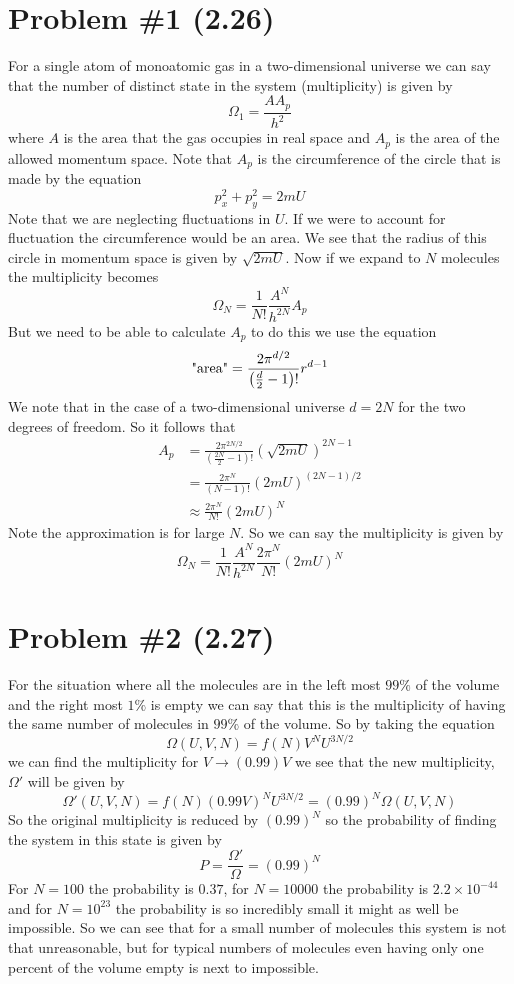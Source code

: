\documentclass[11pt]{article}
\numberwithin{equation}{section}
\begin{document}


\section{Problem \#1 (2.26)}
For a single atom of monoatomic gas in a two-dimensional universe we can say that the number of distinct state in the system (multiplicity) is given by
$$\Omega_1 = \frac{AA_p}{h^2}$$
where $A$ is the area that the gas occupies in real space and $A_p$ is the area of the allowed momentum space. Note that $A_p$ is the circumference of the circle that is made by the equation
$$p_x^2+p_y^2 = 2mU$$
Note that we are neglecting fluctuations in $U$. If we were to account for fluctuation the circumference would be an area. We see that the radius of this circle in momentum space is given by $\sqrt{2mU}$. Now if we expand to $N$ molecules the multiplicity becomes
$$\Omega_N = \frac{1}{N!}\frac{A^N}{h^{2N}}A_p$$
But we need to be able to calculate $A_p$ to do this we use the equation 
$$\textnormal{"area"} = \frac{2\pi^{d/2}}{\left(\frac{d}{2}-1\right)!}r^{d-1}$$
We note that in the case of a two-dimensional universe $d=2N$ for the two degrees of freedom. So it follows that 
\begin{align*}
A_p &= \frac{2\pi^{2N/2}}{\left(\frac{2N}{2}-1\right)!}(\sqrt{2mU})^{2N-1}\\
&= \frac{2\pi^{N}}{\left(N-1\right)!}(2mU)^{(2N-1)/2}\\
&\approx \frac{2\pi^{N}}{N!}(2mU)^{N}
\end{align*}
Note the approximation is for large $N$. So we can say the multiplicity is given by 
$$\Omega_N = \frac{1}{N!}\frac{A^N}{h^{2N}}\frac{2\pi^{N}}{N!}(2mU)^{N}$$

\section{Problem \#2 (2.27)}
For the situation where all the molecules are in the left most $99\%$ of the volume and the right most $1\%$ is empty we can say that this is the multiplicity of having the same number of molecules in $99\%$ of the volume. So by taking the equation 
$$\Omega(U,V,N) = f(N)V^NU^{3N/2}$$
we can find the multiplicity for $V\rightarrow(0.99)V$ we see that the new multiplicity, $\Omega'$ will be given by
$$\Omega'(U,V,N) = f(N)(0.99V)^NU^{3N/2} = (0.99)^N\Omega(U,V,N)$$
So the original multiplicity is reduced by $(0.99)^N$ so the probability of finding the system in this state is given by
$$P = \frac{\Omega'}{\Omega} = (0.99)^N$$
For $N=100$ the probability is $0.37$, for $N=10000$ the probability is $2.2\times10^{-44}$ and for $N=10^{23}$ the probability is so incredibly small it might as well be impossible. So we can see that for a small number of molecules this system is not that unreasonable, but for typical numbers of molecules even having only one percent of the volume empty is next to impossible.
\end{document}
